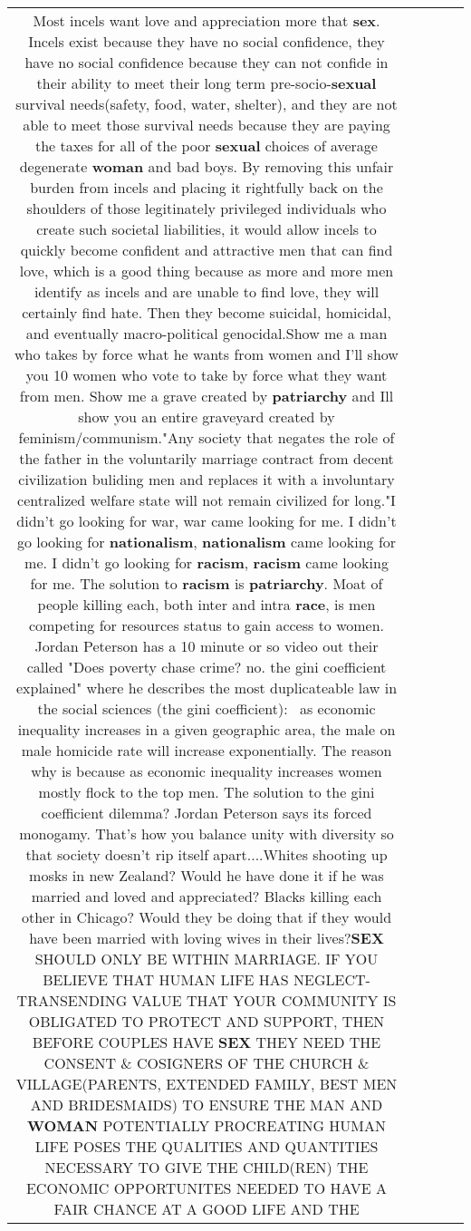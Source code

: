 \documentclass[11pt]{article}
\newlength\mylength
\begin{document}
\begin{center}
\begin{longtable}{|C{.65\mylength}|C{.30\mylength}|C{.12\mylength}|C{.12\mylength}|C{.12\mylength}|}
  \small Most incels want love and appreciation more that \textbf{sex}. Incels exist because they have no social confidence, they have no social confidence because they can not confide in their ability to meet their long term pre-socio-\textbf{sexual} survival needs(safety, food, water, shelter), and they are not able to meet those survival needs because they are paying the taxes for all of the poor \textbf{sexual} choices of average degenerate \textbf{woman} and bad boys. By removing this unfair burden from incels and placing it rightfully back on the shoulders of those legitinately privileged individuals who create such societal liabilities, it would allow incels to quickly become confident and attractive men that can find love, which is a good thing because as more and more men identify as incels and are unable to find love, they will certainly find hate. Then they become suicidal, homicidal, and eventually macro-political genocidal.Show me a man who takes by force what he wants from women and I'll show you 10 women who vote to take by force what they want from men. Show me a grave created by \textbf{patriarchy} and Ill show you an entire graveyard created by feminism/communism."Any society that negates the role of the father in the voluntarily marriage contract from decent civilization buliding men and replaces it with a involuntary centralized welfare state will not remain civilized for long."I didn't go looking for war, war came looking for me. I didn't go looking for \textbf{nationalism}, \textbf{nationalism} came looking for me. I didn't go looking for \textbf{racism}, \textbf{racism} came looking for me. The solution to \textbf{racism} is \textbf{patriarchy}. Moat of people killing each, both inter and intra \textbf{race}, is men competing for resources status to gain access to women. Jordan Peterson has a 10 minute or so video out their called "Does poverty chase crime? no. the gini coefficient explained" where he describes the most duplicateable law in the social sciences (the gini coefficient):  as economic inequality increases in a given geographic area, the male on male homicide rate will increase exponentially. The reason why is because as economic inequality increases women mostly flock to the top men. The solution to the gini coefficient dilemma? Jordan Peterson says its forced monogamy. That's how you balance unity with diversity so that society doesn't rip itself apart....Whites shooting up mosks in new Zealand? Would he have done it if he was married and loved and appreciated? Blacks killing each other in Chicago? Would they be doing that if they would have been married with loving wives in their lives?\textbf{SEX} SHOULD ONLY BE WITHIN MARRIAGE. IF YOU BELIEVE THAT HUMAN LIFE HAS NEGLECT-TRANSENDING VALUE THAT YOUR COMMUNITY IS OBLIGATED TO PROTECT AND SUPPORT, THEN BEFORE COUPLES HAVE \textbf{SEX} THEY NEED THE CONSENT \& COSIGNERS OF THE CHURCH \& VILLAGE(PARENTS, EXTENDED FAMILY, BEST MEN AND BRIDESMAIDS) TO ENSURE THE MAN AND \textbf{WOMAN} POTENTIALLY PROCREATING HUMAN LIFE POSES THE QUALITIES AND QUANTITIES NECESSARY TO GIVE THE CHILD(REN) THE ECONOMIC OPPORTUNITES NEEDED TO HAVE A FAIR CHANCE AT A GOOD LIFE AND THE 
\end{longtable}
\end{center}
\end{document}
